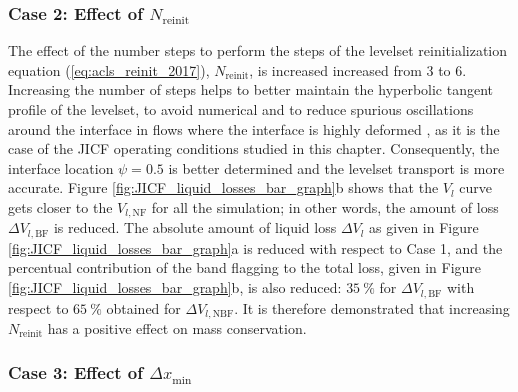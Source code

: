 \subsubsection*{Case 2: Effect of $N_\mathrm{reinit}$}



The effect of the number steps to perform the steps of the levelset reinitialization equation (\ref{eq:acls_reinit_2017}), $N_\mathrm{reinit}$, is increased increased from 3 to 6. Increasing the number of steps helps to better maintain the hyperbolic tangent profile of the levelset, to avoid numerical and to reduce spurious oscillations around the interface in flows where the interface is highly deformed , as it is the case of the JICF operating conditions studied in this chapter. Consequently, the interface location $\psi = 0.5$ is better determined and the levelset transport is more accurate. Figure \ref{fig:JICF_liquid_losses_bar_graph}b shows that the $V_l$ curve gets closer to the $V_{l,\mathrm{NF}}$ for all the simulation; in other words, the amount of loss $\Delta V_{l,\mathrm{BF}}$ is reduced. The absolute amount of liquid loss $\Delta V_l$ as given in Figure \ref{fig:JICF_liquid_losses_bar_graph}a is reduced with respect to Case 1, and the percentual contribution of the band flagging to the total loss, given in Figure \ref{fig:JICF_liquid_losses_bar_graph}b, is also reduced: $35~\%$ for $\Delta V_{l,\mathrm{BF}}$ with respect to $65~\%$ obtained for $\Delta V_{l,\mathrm{NBF}}$. It is therefore demonstrated that increasing $N_\mathrm{reinit}$ has a positive effect on mass conservation.


\subsubsection*{Case 3: Effect of $\Delta x_\mathrm{min}$}

